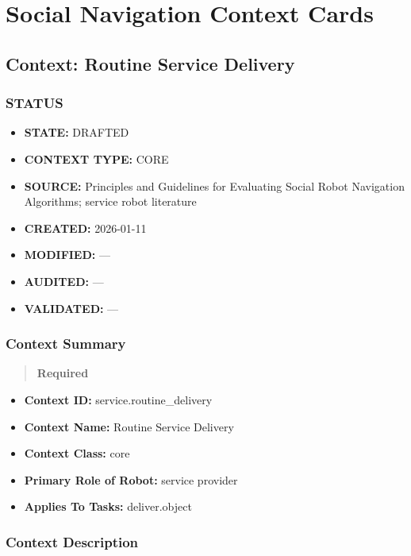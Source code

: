 \documentclass[utf8]{frontiers_suppmat} %
\providecommand{\tightlist}{%
  \setlength{\itemsep}{0pt}\setlength{\parskip}{0pt}}
\begin{document}
\section{Social Navigation Context Cards}
\subsection{Context: Routine Service
Delivery}\label{context-routine-service-delivery}

\subsubsection{STATUS}\label{status}

\begin{itemize}
\tightlist
\item
  \textbf{STATE:} DRAFTED
\item
  \textbf{CONTEXT TYPE:} CORE
\item
  \textbf{SOURCE:} Principles and Guidelines for Evaluating Social Robot
  Navigation Algorithms; service robot literature
\item
  \textbf{CREATED:} 2026-01-11
\item
  \textbf{MODIFIED:} ---
\item
  \textbf{AUDITED:} ---
\item
  \textbf{VALIDATED:} ---
\end{itemize}

\subsubsection{Context Summary}\label{context-summary}

\begin{quote}
\textbf{Required}
\end{quote}

\begin{itemize}
\tightlist
\item
  \textbf{Context ID:} service.routine\_delivery
\item
  \textbf{Context Name:} Routine Service Delivery
\item
  \textbf{Context Class:} core
\item
  \textbf{Primary Role of Robot:} service provider
\item
  \textbf{Applies To Tasks:} deliver.object
\end{itemize}

\subsubsection{Context Description}\label{context-description}
\end{document}

